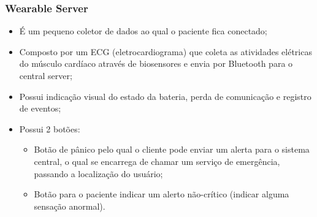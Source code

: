 \documentclass{beamer}
\begin{document}
\begin{frame}
	\frametitle{Wearable Server}

	\begin{itemize}
		\item É um pequeno coletor de dados ao qual o paciente fica conectado;
		\item Composto por um ECG (eletrocardiograma) que coleta as atividades elétricas do músculo cardíaco através de biosensores e envia por Bluetooth para o central server;
		\item Possui indicação visual do estado da bateria, perda de comunicação e registro de eventos;
		\item Possui 2 botões:
		\begin{itemize}
			\item Botão de pânico pelo qual o cliente pode enviar um alerta para o sistema central, o qual se encarrega de chamar um serviço de emergência, passando a localização do usuário;
			\item Botão para o paciente indicar um alerto não-crítico (indicar alguma sensação anormal).
		\end{itemize}
	\end{itemize}
\end{frame}

\end{document}

